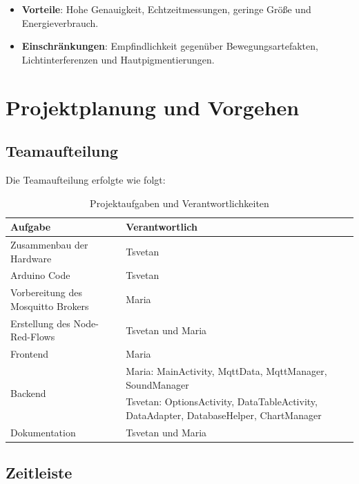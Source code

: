 \documentclass[conference,a4paper,flushend]{cs-techrep}
\begin{document}
\begin{itemize}
    \item \textbf{Vorteile}: Hohe Genauigkeit, Echtzeitmessungen, geringe Größe und Energieverbrauch.
    \item \textbf{Einschränkungen}: Empfindlichkeit gegenüber Bewegungsartefakten, Lichtinterferenzen und Hautpigmentierungen.
\end{itemize}

\section{Projektplanung und Vorgehen}

\subsection{Teamaufteilung}

Die Teamaufteilung erfolgte wie folgt:
\begin{table}[h!]
    \centering
    \renewcommand{\arraystretch}{2} %
    \begin{tabular}{|p{3cm}|p{5cm}|}
        \hline
        \textbf{Aufgabe} & \textbf{Verantwortlich} \\ \hline
        Zusammenbau der Hardware & Tsvetan \\ \hline
        Arduino Code & Tsvetan \\ \hline
        Vorbereitung des Mosquitto Brokers & Maria \\ \hline
        Erstellung des Node-Red-Flows & Tsvetan und Maria \\ \hline
        Frontend & Maria \\ \hline
        \multirow{2}{3cm}{Backend} & Maria: MainActivity, MqttData, MqttManager, SoundManager \\ 
                                   & Tsvetan: OptionsActivity, DataTableActivity, DataAdapter, DatabaseHelper, ChartManager \\ \hline
        Dokumentation & Tsvetan und Maria \\ \hline
    \end{tabular}
    \vspace{0.5cm} %
    \caption{Projektaufgaben und Verantwortlichkeiten}
    \label{tab:project_tasks}
\end{table}
\vspace{10em}
\subsection{Zeitleiste}
\end{document}
